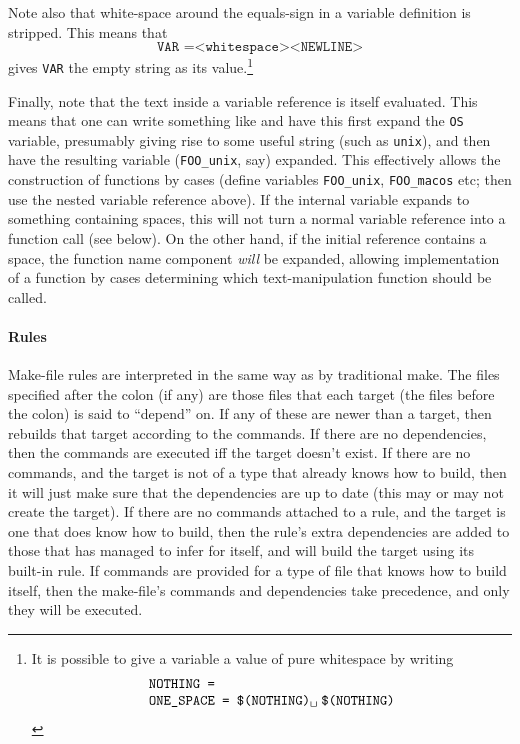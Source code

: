 Note also that white-space around the equals-sign in a variable
definition is stripped.  This means that
\[
\texttt{VAR =<whitespace><NEWLINE>}
\] gives \texttt{VAR} the empty string as its value.\footnote{It is
  possible to give a variable a value of pure whitespace by writing \[
\begin{array}{l}
\texttt{NOTHING =}\\
\texttt{ONE\_SPACE = \varref{NOTHING}\textvisiblespace\hspace{1mm}\varref{NOTHING}}\\
\end{array}\]}

Finally, note that the text inside a variable reference is itself
evaluated.  This means that one can write something like
 and have this first expand the \texttt{OS}
variable, presumably giving rise to some useful string (such as
\texttt{unix}), and then have the resulting variable
(\texttt{FOO\_unix}, say) expanded.  This effectively allows the
construction of functions by cases (define variables
\texttt{FOO\_unix}, \texttt{FOO\_macos} etc; then use the nested
variable reference above).  If the internal variable expands to
something containing spaces, this will not turn a normal variable
reference into a function call (see below).  On the other hand,
if the initial reference contains a space, the function name component
\emph{will} be expanded, allowing implementation of a function by
cases determining which text-manipulation function should be called.

\paragraph{Rules}
Make-file rules are interpreted in the same way as by traditional
\textsf{make}.  The files specified after the colon (if any) are those
files that each target (the files before the colon) is said to
``depend'' on.  If any of these are newer than a target, then
\holmake{} rebuilds that target according to the commands.  If there
are no dependencies, then the commands are executed iff the
target doesn't exist.  If there are no commands, and the target is not
of a type that \holmake{} already knows how to build, then it will
just make sure that the dependencies are up to date (this may or
may not create the target).  If there are no commands attached to a
rule, and the target is one that \holmake{} does know how to build,
then the rule's extra dependencies are added to those that \holmake{}
has managed to infer for itself, and \holmake{} will build the target
using its built-in rule.  If commands are provided for a type of file
that \holmake{} knows how to build itself, then the make-file's
commands and dependencies take precedence, and only they will be
executed.

